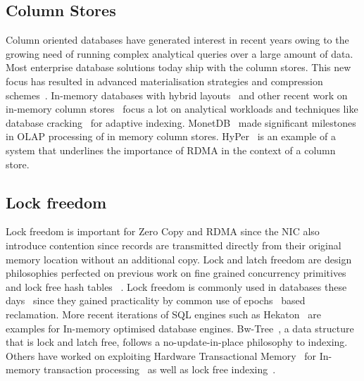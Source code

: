 \subsection{Column Stores}
Column oriented databases have generated interest in recent years owing to the growing 
need of running complex analytical queries over a large amount of data. Most enterprise 
database solutions today ship with the column stores. This new focus has resulted 
in advanced materialisation strategies and compression schemes~\cite{cstore,cstorevsrowstore,cstore-material,cstorecompression}.
In-memory databases with hybrid layouts~\cite{hybridinmemorycolstore} and other recent work on in-memory column stores~\cite{inmemorycracking} 
focus a lot on analytical workloads and techniques like database cracking~\cite{databasecracking} for adaptive indexing. 
MonetDB~\cite{monetdb} made significant milestones in OLAP processing of in memory column stores. HyPer~\cite{hyperhybrid} 
is an example of a system that underlines the importance of RDMA in the context of a column store.


\subsection{Lock freedom}
Lock freedom is important for Zero Copy and RDMA since the NIC also introduce contention 
since records are transmitted directly from their original memory location without an 
additional copy. Lock and latch freedom are 
design philosophies perfected on previous work on fine grained concurrency 
primitives~\cite{finegrained} and lock free hash tables ~\cite{lockfreeht}. Lock freedom is commonly
used in databases these days~\cite{htm} since they gained practicality by common use of
epochs~\cite{lockfreedom} based reclamation. 
More recent iterations of SQL engines such as Hekaton~\cite{hekaton} are 
examples for In-memory optimised  database engines. Bw-Tree~\cite{bw-tree}, a 
data structure that is lock and latch free, follows a no-update-in-place philosophy to indexing.
Others have worked on exploiting Hardware Transactional Memory~\cite{htm-old}
for In-memory transaction processing~\cite{drtm} as well as lock free indexing~\cite{htm}.

